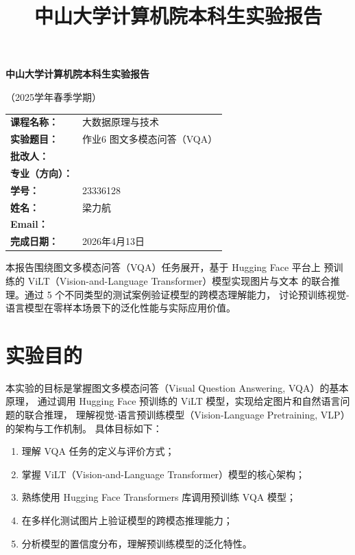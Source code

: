 \documentclass[UTF8,a4paper,12pt,fontset=none]{ctexart}
\title{\heiti 中山大学计算机院本科生实验报告}
\author{}
\date{}
\begin{document}
\begin{titlepage}
  \centering
  {\bfseries 中山大学计算机院本科生实验报告\par}
  \vspace{0.5em}
  {（2025学年春季学期）\par}
  \vspace{2em}

  \begin{tabularx}{0.9\textwidth}{>{\bfseries}p{4cm}X}
    课程名称： & 大数据原理与技术 \\
    实验题目： & 作业6 图文多模态问答（VQA） \\
    批改人： & \\
    专业（方向）： & \\
    学号： & 23336128 \\
    姓名： & 梁力航 \\
    Email： & \\
    完成日期： & 2026年4月13日 \\
  \end{tabularx}

  \vfill
  \begin{minipage}{0.88\textwidth}
    \small
    本报告围绕图文多模态问答（VQA）任务展开，基于 Hugging Face 平台上
    预训练的 ViLT（Vision-and-Language Transformer）模型实现图片与文本
    的联合推理。通过 5 个不同类型的测试案例验证模型的跨模态理解能力，
    讨论预训练视觉-语言模型在零样本场景下的泛化性能与实际应用价值。
  \end{minipage}
\end{titlepage}

\section{实验目的}

本实验的目标是掌握图文多模态问答（Visual Question Answering, VQA）的基本原理，
通过调用 Hugging Face 预训练的 ViLT 模型，实现给定图片和自然语言问题的联合推理，
理解视觉-语言预训练模型（Vision-Language Pretraining, VLP）的架构与工作机制。
具体目标如下：

\begin{enumerate}[leftmargin=2.2em]
  \item 理解 VQA 任务的定义与评价方式；
  \item 掌握 ViLT（Vision-and-Language Transformer）模型的核心架构；
  \item 熟练使用 Hugging Face Transformers 库调用预训练 VQA 模型；
  \item 在多样化测试图片上验证模型的跨模态推理能力；
  \item 分析模型的置信度分布，理解预训练模型的泛化特性。
\end{enumerate}
\end{document}
